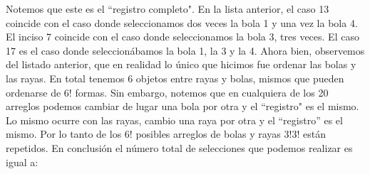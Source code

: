 \documentclass[14pt]{extreport}
\theoremstyle{definicion}
\theoremstyle{propiedad}
\begin{document}
\begin{center}
 \end{center}
Notemos que este es el ``registro completo". En la lista anterior, el caso 13 coincide con el caso donde seleccionamos dos veces la bola 1 y una vez la bola 4. El inciso 7 coincide con el caso donde seleccionamos la bola 3, tres veces. El caso 17 es el caso donde seleccionábamos la bola 1, la 3 y la 4. Ahora bien, observemos del listado anterior, que en realidad lo único que hicimos fue ordenar las bolas y las rayas. En total tenemos 6 objetos entre rayas y bolas, mismos que pueden ordenarse de $6!$ formas. Sin embargo, notemos que en cualquiera de los 20 arreglos podemos cambiar de lugar una bola por otra y el ``registro" es el mismo. Lo mismo ocurre con las rayas, cambio una raya por otra y el ``registro'' es el mismo. Por lo tanto de los $6!$ posibles arreglos de bolas y rayas $3!3!$ están repetidos. En conclusión el número total de selecciones que podemos realizar es igual a: 
\end{document}
